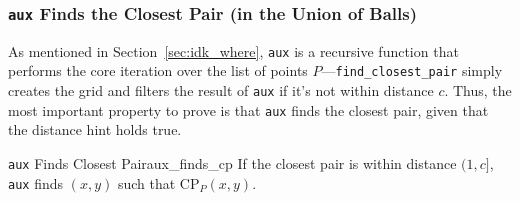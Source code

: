 \documentclass{article}
\begin{document}
\subsubsection{{\large\texttt{aux}} Finds the Closest Pair (in the Union of Balls)}\label{sec:change_ih}

As mentioned in Section~\ref{sec:idk_where}, \texttt{aux} is a recursive function that performs the core iteration over the list of points $P$---\texttt{find\_closest\_pair} simply creates the grid and filters the result of \texttt{aux} if it's not within distance $c$.
Thus, the most important property to prove is that \texttt{aux} finds the closest pair, given that the distance hint holds true.

\begin{tcblemma}{{\large\texttt{aux}} Finds Closest Pair}{aux_finds_cp}
If the closest pair is within distance $(1, c]$, \texttt{aux} finds $(x, y)$ such that $\text{CP}_P(x, y)$.
\end{tcblemma}
\end{document}
